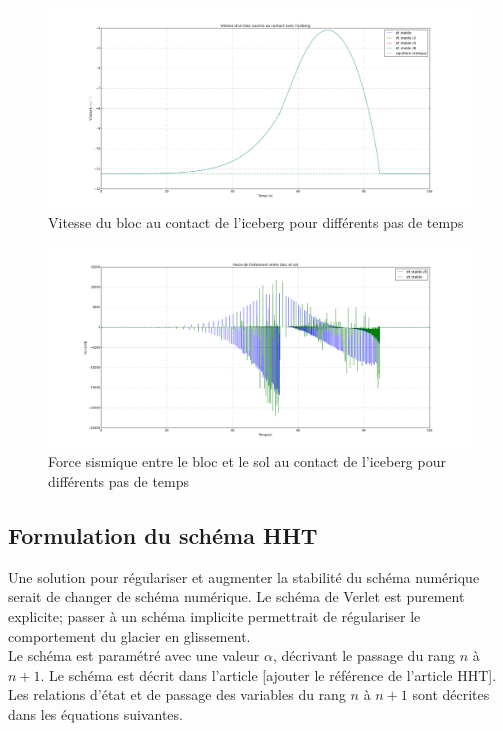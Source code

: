 \documentclass[11pt, a4paper]{article}
\begin{document}
\begin{figure}[h!]
	\centering
	\includegraphics[width=1\linewidth]{figures/Part3/Subpart3/Vitesse.png}
	\caption{Vitesse du bloc au contact de l'iceberg pour différents pas de temps}
	\label{UdStableLinear}
\end{figure}

\begin{figure}[h!]
	\centering
	\includegraphics[width=1\linewidth]{figures/Part3/Subpart3/Fsismique.png}
	\caption{Force sismique entre le bloc et le sol au contact de l'iceberg pour différents pas de temps}
	\label{FsisStableLinear}
\end{figure}


\subsection{Formulation du schéma HHT}
Une solution pour régulariser et augmenter la stabilité du schéma numérique serait de changer de schéma numérique. Le schéma de Verlet est purement explicite; passer à un schéma implicite permettrait de régulariser le comportement du glacier en glissement.
\\

Le schéma est paramétré avec une valeur $\alpha$, décrivant le passage du rang $n$ à $n+1$. Le schéma est décrit dans l'article [ajouter le référence de l'article HHT]. Les relations d'état et de passage des variables du rang $n$ à $n+1$ sont décrites dans les équations suivantes.
\\
\end{document}
